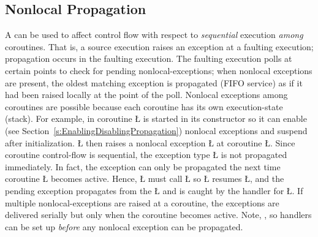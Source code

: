 \documentclass[openright,twoside]{report}
\begin{document}
\subsection{Nonlocal Propagation}

A  can be used to affect control flow with respect to \emph{sequential} execution \emph{among} coroutines.
That is, a source execution raises an exception at a faulting execution;
propagation occurs in the faulting execution.
The faulting execution polls at certain points to check for pending nonlocal-exceptions;
when nonlocal exceptions are present, the oldest matching exception is propagated (FIFO service) as if it had been raised locally at the point of the poll.
Nonlocal exceptions among coroutines are possible because each coroutine has its own execution-state (stack).
For example, in  coroutine \LGinlinetrue\LGbegin\lgrinde\L{}\endlgrinde\LGend{} is started in its constructor so it can enable (see Section~\ref{s:EnablingDisablingPropagation}) nonlocal exceptions and suspend after initialization.
\LGinlinetrue\LGbegin\lgrinde\L{}\endlgrinde\LGend{} then raises a nonlocal exception \LGinlinetrue\LGbegin\lgrinde\L{}\endlgrinde\LGend{} at coroutine \LGinlinetrue\LGbegin\lgrinde\L{}\endlgrinde\LGend{}.
Since coroutine control-flow is sequential, the exception type \LGinlinetrue\LGbegin\lgrinde\L{}\endlgrinde\LGend{} is not propagated immediately.
In fact, the exception can only be propagated the next time coroutine \LGinlinetrue\LGbegin\lgrinde\L{}\endlgrinde\LGend{} becomes active.
Hence, \LGinlinetrue\LGbegin\lgrinde\L{}\endlgrinde\LGend{} must call \LGinlinetrue\LGbegin\lgrinde\L{}\endlgrinde\LGend{} so \LGinlinetrue\LGbegin\lgrinde\L{}\endlgrinde\LGend{} resumes \LGinlinetrue\LGbegin\lgrinde\L{}\endlgrinde\LGend{}, and the pending exception propagates from the \LGinlinetrue\LGbegin\lgrinde\L{}\endlgrinde\LGend{} and is caught by the handler for \LGinlinetrue\LGbegin\lgrinde\L{}\endlgrinde\LGend{}.
If multiple nonlocal-exceptions are raised at a coroutine, the exceptions are delivered serially but only when the coroutine becomes active.
Note, , so handlers can be set up \emph{before} any nonlocal exception can be propagated.
\end{document}
